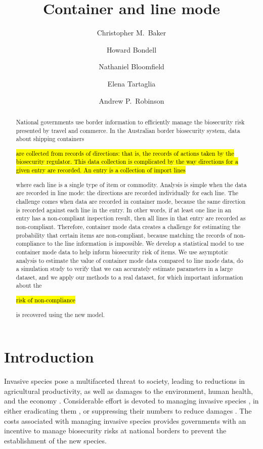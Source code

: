 \documentclass{article}
\title{Container and line mode}
\author{Christopher M.\ Baker \and Howard Bondell \and Nathaniel Bloomfield \and Elena Tartaglia \and Andrew P.\ Robinson}
\newif\ifproofread
\newcommand{\rev}[1]{%
\ifproofread
\hl{#1}%
\else
#1%
\fi
}
\begin{document}
\proofreadtrue


\maketitle
\begin{abstract}
National governments use border information to efficiently manage the biosecurity risk presented by travel and commerce. In the Australian border biosecurity system, data about shipping containers \rev{are collected from records of directions: that is, the records of actions taken by the biosecurity regulator. This data collection is complicated by the way directions for a given entry are recorded. An entry is a collection of import lines} where each line is a single type of item or commodity. Analysis is simple when the data are recorded in line mode: the directions are recorded individually for each line. The challenge comes when data are recorded in container mode, because the same direction is recorded against each line in the entry. In other words, if at least one line in an entry has a non-compliant inspection result, then all lines in that entry are recorded as non-compliant. Therefore, container mode data creates a challenge for estimating the probability that certain items are non-compliant, because matching the records of non-compliance to the line information is impossible. We develop a statistical model to use container mode data to help inform biosecurity risk of items. We use asymptotic analysis to estimate the value of container mode data compared to line mode data, do a simulation study to verify that we can accurately estimate parameters in a large dataset, and we apply our methods to a real dataset, for which important information about the \rev{risk of non-compliance} is recovered using the new model. 
\end{abstract}

\section{Introduction}

Invasive species pose a multifaceted threat to society, leading to reductions in agricultural productivity, as well as damages to the environment, human health, and the economy \citep{kumar_rai_invasive_2020}. Considerable effort is devoted to managing invasive species \citep{jardine_estimating_2018}, in either eradicating them \citep{baker_recent_2020,holmes_globally_2019, wenger_estimating_2017,helmstedt_prioritizing_2016}, or suppressing their numbers to reduce damages \citep{binny_long-term_2021,brook_effects_2012,sharov_slow_2002}. The costs associated with managing invasive species provides governments with an incentive to manage biosecurity risks at national borders to prevent the establishment of the new species. 
\end{document}
